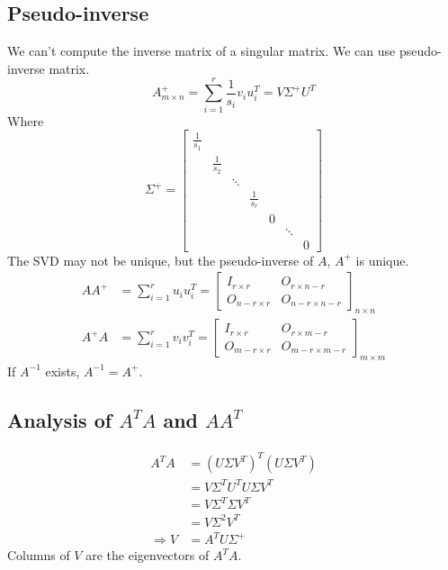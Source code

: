 \documentclass[11pt]{elegantbook}
\begin{document}
\subsection{Pseudo-inverse}
We can't compute the inverse matrix of a singular matrix. We can use pseudo-inverse matrix.
$$A^+_{m\times n}=\sum_{i=1}^r\frac{1}{s_i}v_iu_i^T=V\Sigma^+U^T$$
Where $$\Sigma^+=\begin{bmatrix}
    \frac{1}{s_1}&&&&&&\\
    &\frac{1}{s_2}&&&&&\\
    &&\ddots&&&&\\
    &&&\frac{1}{s_r}&&&\\
    &&&&0&&\\
    &&&&&\ddots&\\
    &&&&&&0
\end{bmatrix}$$
The SVD may not be unique, but the pseudo-inverse of $A$, $A^+$ is unique.
\begin{equation}
    \begin{aligned}
        AA^+&=\sum_{i=1}^ru_iu_i^T=\begin{bmatrix}
            I_{r\times r}&	O_{r\times n-r}\\
            O_{n-r\times r}&	O_{n-r\times n-r}
        \end{bmatrix}_{n\times n}\\
        A^+A&=\sum_{i=1}^rv_iv_i^T=\begin{bmatrix}
            I_{r\times r}&	O_{r\times m-r}\\
            O_{m-r\times r}&	O_{m-r\times m-r}
        \end{bmatrix}_{m\times m}
    \end{aligned}
    \nonumber
\end{equation}
If $A^{-1}$ exists, $A^{-1}=A^+$.

\subsection{Analysis of $A^TA$ and $AA^T$}
\begin{equation}
    \begin{aligned}
        A^TA&=(U\Sigma V^T)^T(U\Sigma V^T)\\
        &=V\Sigma^TU^TU\Sigma V^T\\
        &=V\Sigma^T\Sigma V^T\\
        &=V\Sigma^2 V^T\\
        \Rightarrow	V&=A^TU\Sigma^+
    \end{aligned}
    \nonumber
\end{equation}
Columns of $V$ are the eigenvectors of $A^TA$.
\end{document}
